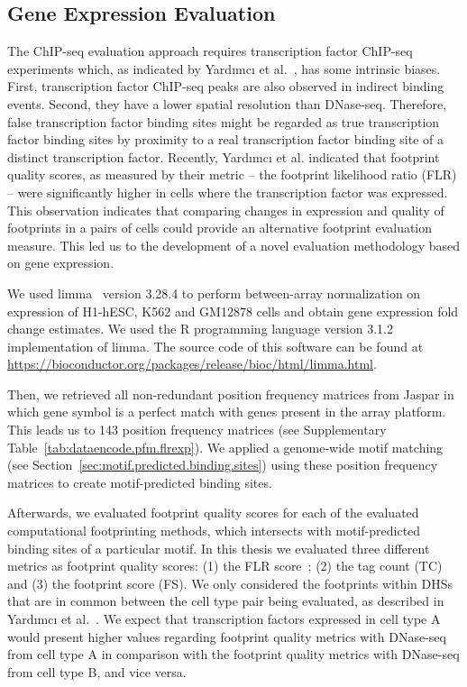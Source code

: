 \subsection{Gene Expression Evaluation}
\label{sec:gene.expression.evaluation}

The ChIP-seq evaluation approach requires transcription factor ChIP-seq experiments which, as indicated by Yard{\i}mc{\i} et al.~\cite{yardimci2014}, has some intrinsic biases. First, transcription factor ChIP-seq peaks are also observed in indirect binding events. Second, they have a lower spatial resolution than DNase-seq. Therefore, false transcription factor binding sites might be regarded as true transcription factor binding sites by proximity to a real transcription factor binding site of a distinct transcription factor. Recently, Yard{\i}mc{\i} et al.\cite{yardimci2014} indicated that footprint quality scores, as measured by their metric -- the footprint likelihood ratio (FLR) -- were significantly higher in cells where the transcription factor was expressed. This observation indicates that comparing changes in expression and quality of footprints in a pairs of cells could provide an alternative footprint evaluation measure. This led us to the development of a novel evaluation methodology based on gene expression.

We used limma~\cite{ritchie2015} version 3.28.4 to perform between-array normalization on expression of H1-hESC, K562 and GM12878 cells and obtain gene expression fold change estimates. We used the R programming language version 3.1.2 implementation of limma. The source code of this software can be found at \url{https://bioconductor.org/packages/release/bioc/html/limma.html}.

Then, we retrieved all non-redundant position frequency matrices from Jaspar in which gene symbol is a perfect match with genes present in the array platform. This leads us to 143 position frequency matrices (see Supplementary Table~\ref{tab:dataencode.pfm.flrexp}). We applied a genome-wide motif matching (see Section~\ref{sec:motif.predicted.binding.sites}) using these position frequency matrices to create motif-predicted binding sites.

Afterwards, we evaluated footprint quality scores for each of the evaluated computational footprinting methods, which intersects with motif-predicted binding sites of a particular motif. In this thesis we evaluated three different metrics as footprint quality scores: (1) the FLR score~\cite{yardimci2014}; (2) the tag count (TC) and (3) the footprint score (FS). We only considered the footprints within DHSs that are in common between the cell type pair being evaluated, as described in Yard{\i}mc{\i} et al.~\cite{yardimci2014}. We expect that transcription factors expressed in cell type A would present higher values regarding footprint quality metrics with DNase-seq from cell type A in comparison with the footprint quality metrics with DNase-seq from cell type B, and vice versa.

